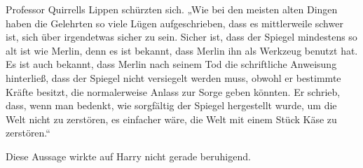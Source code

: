 Professor Quirrells Lippen schürzten sich.
„Wie bei den meisten alten Dingen haben die Gelehrten so viele Lügen aufgeschrieben, dass es mittlerweile schwer ist, sich über irgendetwas sicher zu sein. Sicher ist, dass der Spiegel mindestens so alt ist wie Merlin, denn es ist bekannt, dass Merlin ihn als Werkzeug benutzt hat. Es ist auch bekannt, dass Merlin nach seinem Tod die schriftliche Anweisung hinterließ, dass der Spiegel nicht versiegelt werden muss, obwohl er bestimmte Kräfte besitzt, die normalerweise Anlass zur Sorge geben könnten. Er schrieb, dass, wenn man bedenkt, wie sorgfältig der Spiegel hergestellt wurde, um die Welt nicht zu zerstören, es einfacher wäre, die Welt mit einem Stück Käse zu zerstören.“

Diese Aussage wirkte auf Harry nicht gerade beruhigend.

